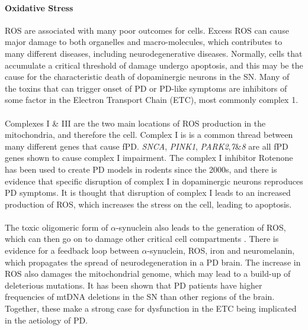 \documentclass{article}
\begin{document}
\paragraph{Oxidative Stress}
\label{para:oxidative}
ROS are associated with many poor outcomes for cells. Excess ROS can cause major damage to both organelles and macro-molecules, which contributes to many different diseases, including neurodegenerative diseases\cite{Brieger2012ReactiveDisease}. Normally, cells that accumulate a critical threshold of damage undergo apoptosis, and this may be the cause for the characteristic death of dopaminergic neurons in the SN\cite{Subramaniam2013MitochondrialDisease}. Many of the toxins that can trigger onset of PD or PD-like symptoms are inhibitors of some factor in the Electron Transport Chain (ETC), most commonly complex 1\cite{Subramaniam2013MitochondrialDisease}.
\\
\\Complexes I \& III are the two main locations of ROS production in the mitochondria\cite{Murphy2009HowSpecies}, and therefore the cell. Complex I is is a common thread between many different genes that cause fPD. \textit{SNCA}, \textit{PINK1}, \textit{PARK2},\textit{7}\&\textit{8} are all fPD genes shown to cause complex I impairment\cite{Subramaniam2013MitochondrialDisease}. The complex I inhibitor Rotenone has been used to create PD models in rodents since the 2000s\cite{Betarbet2000ChronicDisease}, and there is evidence that specific disruption of complex I in dopaminergic neurons reproduces PD symptoms\cite{Gonzalez-Rodriguez2021DisruptionParkinsonism}. It is thought that disruption of complex I leads to an increased production of ROS, which increases the stress on the cell, leading to apoptosis\cite{Subramaniam2013MitochondrialDisease}.
\\
\\The toxic oligomeric form of $\alpha$-synuclein also leads to the generation of ROS, which can then go on to damage other critical cell compartments \cite{Choi2022PathologicalToxicity}. There is evidence for a feedback loop between $\alpha$-synuclein, ROS, iron and neuromelanin, which propagates the spread of neurodegeneration in a PD brain\cite{JansenvanRensburg2021ToxicTurmeric}. The increase in ROS also damages the mitochondrial genome, which may lead to a build-up of deleterious mutations. It has been shown that PD patients have higher frequencies of mtDNA deletions in the SN than other regions of the brain\cite{Bender2006HighDisease}. Together, these make a strong case for dysfunction in the ETC being implicated in the aetiology of PD.
\end{document}
